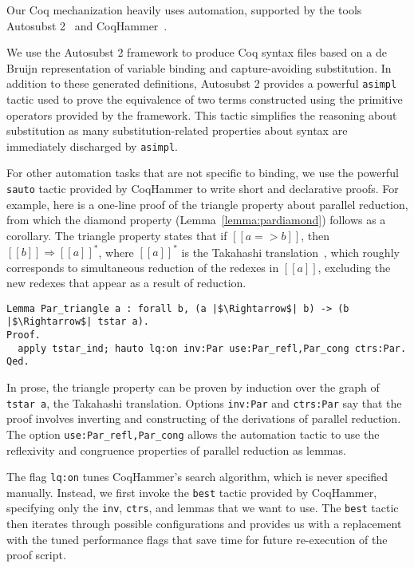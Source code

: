 \documentclass[\ifpublic nolinenum\else\fi,online,OA]{jfp}
\theoremstyle{definition}
\begin{document}
Our Coq mechanization heavily uses automation, supported by the tools
Autosubst 2~\citep{autosubst2} and CoqHammer~\citep{czajka2018hammer}.

We use the Autosubst 2 framework to produce Coq syntax files based on a de
Bruijn representation of variable binding and capture-avoiding substitution.
In addition to these generated definitions, Autosubst 2 provides a powerful
\texttt{asimpl} tactic used to prove the equivalence of two terms
constructed using the primitive operators provided by the framework. This
tactic simplifies the reasoning about substitution as many
substitution-related properties about syntax are immediately discharged by
\texttt{asimpl}.

For other automation tasks that are not specific to binding, we use
the powerful \texttt{sauto} tactic provided by CoqHammer to write
short and declarative proofs. For example, here is a one-line proof of
the triangle property about parallel reduction, from which the diamond
property (Lemma~\ref{lemma:pardiamond}) follows as a corollary.
The triangle property states
that if $[[a => b]]$, then $[[b]]\Rightarrow [[a]]^*$, where $[[a]]^*$
is the Takahashi translation~\citep{takahashi-parallel-reduction},
which roughly corresponds to simultaneous reduction of the redexes in
$[[a]]$, excluding the new redexes that appear as a result of
reduction.
\begin{verbatim}
Lemma Par_triangle a : forall b, (a |$\Rightarrow$| b) -> (b |$\Rightarrow$| tstar a).
Proof.
  apply tstar_ind; hauto lq:on inv:Par use:Par_refl,Par_cong ctrs:Par.
Qed.
\end{verbatim}
In prose, the triangle property can be proven by induction over the graph of
\texttt{tstar a}, the Takahashi translation. Options \texttt{inv:Par}
and \texttt{ctrs:Par} say that the proof involves inverting and constructing
of the derivations of parallel reduction. The option
\texttt{use:Par\_refl,Par\_cong} allows the automation tactic to use the
reflexivity and congruence properties of parallel reduction as lemmas.

The flag \texttt{lq:on} tunes CoqHammer's search algorithm, which is never
specified manually. Instead, we first invoke the \texttt{best} tactic provided by
CoqHammer, specifying only the \texttt{inv}, \texttt{ctrs}, and lemmas that we
want to use. The \texttt{best} tactic then iterates through possible
configurations and provides us with a replacement with the tuned performance
flags that save time for future re-execution of the proof script.
\end{document}
